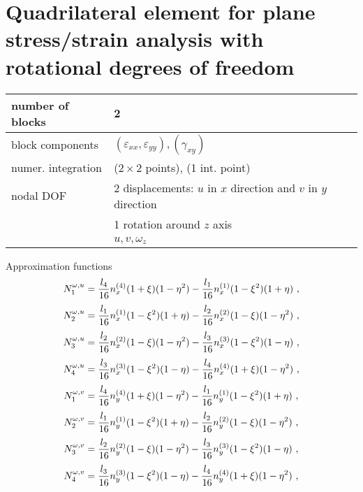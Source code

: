 \section{Quadrilateral element for plane stress/strain ana\-lysis with rotational degrees of freedom}
\label{sectrecelemrotdof}

\begin{tabular}{|l|l|}
\hline
number of blocks & 2
\\ \hline
block components & $(\varepsilon_{xx},\varepsilon_{yy}), (\gamma_{xy})$
\\ \hline
numer. integration & ($2 \times 2$ points), (1 int. point)
\\ \hline
nodal DOF & 2 displacements: $u$ in $x$ direction and $v$ in $y$ direction
\\ \cline{2-2}
 & 1 rotation around $z$ axis
\\ \cline{2-2}
 & $u,v,\omega_z$
\\ \hline
\end{tabular}

Approximation functions
\begin{equation}
N_1^{\omega, u} = \mbox{$\displaystyle\frac{l_4}{16}$}n_x^{(4)}(1+\xi)(1-\eta^2) - \mbox{$\displaystyle\frac{l_1}{16}$}n_x^{(1)}(1-\xi^2)(1+\eta)\ ,
\end{equation}
\begin{equation}
N_2^{\omega, u} = \mbox{$\displaystyle\frac{l_1}{16}$}n_x^{(1)}(1-\xi^2)(1+\eta) - \mbox{$\displaystyle\frac{l_2}{16}$}n_x^{(2)}(1-\xi)(1-\eta^2)\ ,
\end{equation}
\begin{equation}
N_3^{\omega, u} = \mbox{$\displaystyle\frac{l_2}{16}$}n_x^{(2)}(1-\xi)(1-\eta^2) - \mbox{$\displaystyle\frac{l_3}{16}$}n_x^{(3)}(1-\xi^2)(1-\eta)\ ,
\end{equation}
\begin{equation}
N_4^{\omega, u} = \mbox{$\displaystyle\frac{l_3}{16}$}n_x^{(3)}(1-\xi^2)(1-\eta) - \mbox{$\displaystyle\frac{l_4}{16}$}n_x^{(4)}(1+\xi)(1-\eta^2)\ ,
\end{equation}
\begin{equation}
N_1^{\omega, v} = \mbox{$\displaystyle\frac{l_4}{16}$}n_y^{(4)}(1+\xi)(1-\eta^2) - \mbox{$\displaystyle\frac{l_1}{16}$}n_y^{(1)}(1-\xi^2)(1+\eta)\ ,
\end{equation}
\begin{equation}
N_2^{\omega, v} = \mbox{$\displaystyle\frac{l_1}{16}$}n_y^{(1)}(1-\xi^2)(1+\eta) - \mbox{$\displaystyle\frac{l_2}{16}$}n_y^{(2)}(1-\xi)(1-\eta^2)\ ,
\end{equation}
\begin{equation}
N_3^{\omega, v} = \mbox{$\displaystyle\frac{l_2}{16}$}n_y^{(2)}(1-\xi)(1-\eta^2) - \mbox{$\displaystyle\frac{l_3}{16}$}n_y^{(3)}(1-\xi^2)(1-\eta)\ ,
\end{equation}
\begin{equation}
N_4^{\omega, v} = \mbox{$\displaystyle\frac{l_3}{16}$}n_y^{(3)}(1-\xi^2)(1-\eta) - \mbox{$\displaystyle\frac{l_4}{16}$}n_y^{(4)}(1+\xi)(1-\eta^2)\ ,
\end{equation}

